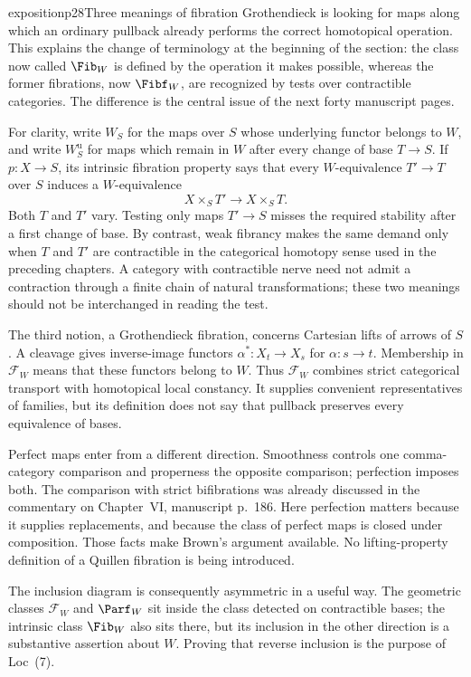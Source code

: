 \begin{dcomment}{exposition}{p28}{Three meanings of fibration}
Grothendieck is looking for maps along which an ordinary pullback already performs the correct homotopical operation. This explains the change of terminology at the beginning of the section: the class now called $\Fib_W$ is defined by the operation it makes possible, whereas the former fibrations, now $\Fibf_W$, are recognized by tests over contractible categories. The difference is the central issue of the next forty manuscript pages.

For clarity, write $W_S$ for the maps over $S$ whose underlying functor belongs to $W$, and write $W_S^{\mathrm u}$ for maps which remain in $W$ after every change of base $T\to S$. If $p:X\to S$, its intrinsic fibration property says that every $W$-equivalence $T'\to T$ over $S$ induces a $W$-equivalence
\[
 X\times_ST'\longrightarrow X\times_ST.
\]
Both $T$ and $T'$ vary. Testing only maps $T'\to S$ misses the required stability after a first change of base. By contrast, weak fibrancy makes the same demand only when $T$ and $T'$ are contractible in the categorical homotopy sense used in the preceding chapters. A category with contractible nerve need not admit a contraction through a finite chain of natural transformations; these two meanings should not be interchanged in reading the test.

The third notion, a Grothendieck fibration, concerns Cartesian lifts of arrows of $S$. A cleavage gives inverse-image functors $\alpha^*:X_t\to X_s$ for $\alpha:s\to t$. Membership in $\mathcal F_W$ means that these functors belong to $W$. Thus $\mathcal F_W$ combines strict categorical transport with homotopical local constancy. It supplies convenient representatives of families, but its definition does not say that pullback preserves every equivalence of bases.

Perfect maps enter from a different direction. Smoothness controls one comma-category comparison and properness the opposite comparison; perfection imposes both. The comparison with strict bifibrations was already discussed in the commentary on Chapter~VI, manuscript p.~186. Here perfection matters because it supplies replacements, and because the class of perfect maps is closed under composition. Those facts make Brown's argument available. No lifting-property definition of a Quillen fibration is being introduced.

The inclusion diagram is consequently asymmetric in a useful way. The geometric classes $\mathcal F_W$ and $\Parf_W$ sit inside the class detected on contractible bases; the intrinsic class $\Fib_W$ also sits there, but its inclusion in the other direction is a substantive assertion about $W$. Proving that reverse inclusion is the purpose of Loc~(7).
\end{dcomment}

